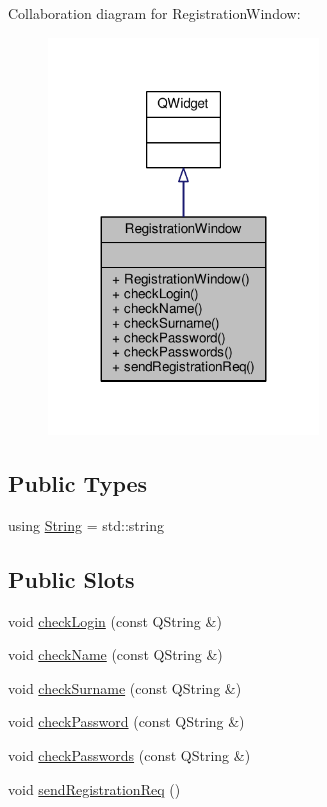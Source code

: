 Collaboration diagram for Registration\+Window\+:
\nopagebreak
\begin{figure}[H]
\begin{center}
\leavevmode
\includegraphics[width=203pt]{classRegistrationWindow__coll__graph}
\end{center}
\end{figure}
\subsection*{Public Types}
\begin{DoxyCompactItemize}
\item 
using \hyperlink{classRegistrationWindow_af737e72502243796bee87789c8b5b9ea}{String} = std\+::string
\end{DoxyCompactItemize}
\subsection*{Public Slots}
\begin{DoxyCompactItemize}
\item 
void \hyperlink{classRegistrationWindow_a054fcf4544f917e106aa6760f720d7b2}{check\+Login} (const Q\+String \&)
\item 
void \hyperlink{classRegistrationWindow_a26d58595ac8df47a0456878a80c45ffc}{check\+Name} (const Q\+String \&)
\item 
void \hyperlink{classRegistrationWindow_a6fc9f673b5e1d2fd15c9e12bfc0174b2}{check\+Surname} (const Q\+String \&)
\item 
void \hyperlink{classRegistrationWindow_a761ec197a38b335aaa5db06287361849}{check\+Password} (const Q\+String \&)
\item 
void \hyperlink{classRegistrationWindow_a6c3761195b00134d3ef4decf91ea76e7}{check\+Passwords} (const Q\+String \&)
\item 
void \hyperlink{classRegistrationWindow_a4344e4dafa6ab47e564c243b20a0c7a4}{send\+Registration\+Req} ()
\end{DoxyCompactItemize}
